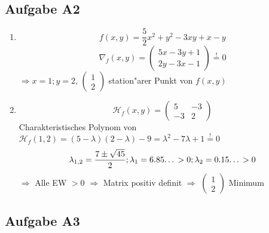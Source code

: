 \documentclass[fleqn,13pt]{scrartcl}
\begin{document}
\subsection*{Aufgabe A2}
\begin{enumerate}
	\item
		\begin{equation*}
			f(x,y) = \frac52x^2 + y^2 -3xy + x - y
		\end{equation*}
		\begin{equation*}
			\nabla_f(x,y) = 
			\begin{pmatrix}
				5x - 3y + 1\\
				2y - 3x - 1
			\end{pmatrix} \overset{!}{=} 0
		\end{equation*}
	$\Rightarrow x = 1; y = 2$, $\begin{pmatrix}1 \\2\end{pmatrix}$ station"arer Punkt von $f(x,y)$

	\item
		\begin{equation*}
			\mathcal{H}_f(x,y) =
			\begin{pmatrix}
				5 & -3 \\
				-3 & 2
			\end{pmatrix}
		\end{equation*}
		Charakteristisches Polynom von $\mathcal{H}_f(1,2) = (5-\lambda)(2-\lambda)-9 = \lambda^2 - 7\lambda + 1 \overset{!}{=} 0$
		\begin{equation*}
			\lambda_{1,2} = \frac{7 \pm \sqrt{45}}2; \lambda_1 = 6.85\text{\dots} > 0; \lambda_2 = 0.15\text{\dots} > 0
		\end{equation*}
	$\Rightarrow$ Alle EW $>0$ $\Rightarrow$ Matrix positiv definit $\Rightarrow$ $\begin{pmatrix}1\\2\end{pmatrix}$ Minimum


\end{enumerate}

\subsection*{Aufgabe A3}
\end{document}
